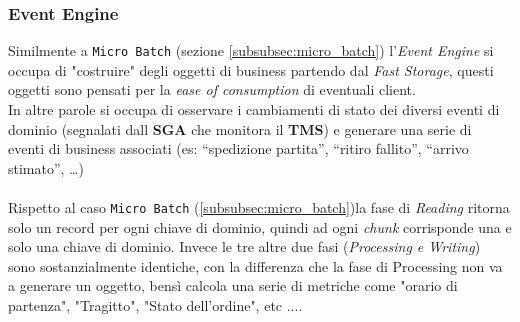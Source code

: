 \subsubsection{Event Engine}
\label{subsubsec:event_engine}
Similmente a \texttt{Micro Batch} (sezione \ref{subsubsec:micro_batch}) l'\textit{Event Engine} si occupa di "costruire" degli oggetti di business partendo dal \textit{Fast Storage}, questi oggetti sono pensati per la \textit{ease of consumption} di eventuali client.\\
In altre parole si occupa di osservare i cambiamenti di stato dei diversi eventi di dominio (segnalati dall \textbf{SGA} che monitora il \textbf{TMS}) e generare una serie di eventi di business associati (es: 
“spedizione partita”, “ritiro fallito”, “arrivo stimato”, …)\\\\
Rispetto al caso \texttt{Micro Batch} (\ref{subsubsec:micro_batch})la fase di \textit{Reading} ritorna solo un record per ogni chiave di dominio,
quindi ad ogni \textit{chunk} corrisponde una e solo una chiave di dominio.
Invece le tre altre due fasi (\textit{Processing e Writing}) sono sostanzialmente identiche, con la differenza che la fase di Processing non va a generare un oggetto, bensì calcola una serie di metriche come "orario di partenza", "Tragitto", "Stato dell'ordine", etc ....